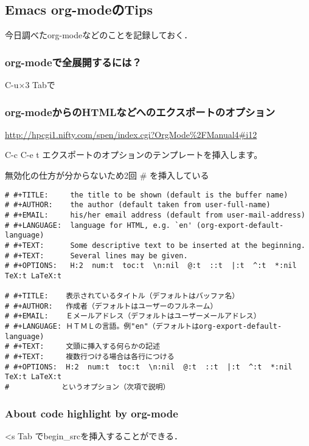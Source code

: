 \documentclass[11pt]{article}
\begin{document}
\subsection{Emacs org-modeのTips}
\label{sec-2-2}

今日調べたorg-modeなどのことを記録しておく．
\subsubsection{org-modeで全展開するには？}
\label{sec-2-2-1}

C-u×3 Tabで
\subsubsection{org-modeからのHTMLなどへのエクスポートのオプション}
\label{sec-2-2-2}

\href{http://hpcgi1.nifty.com/spen/index.cgi?OrgMode%2FManual4#i12}{http://hpcgi1.nifty.com/spen/index.cgi?OrgMode\%2FManual4\#i12}

C-c C-e t       エクスポートのオプションのテンプレートを挿入します。

無効化の仕方が分からないため2回 \# を挿入している

\begin{verbatim}
# #+TITLE:     the title to be shown (default is the buffer name)
# #+AUTHOR:    the author (default taken from user-full-name)
# #+EMAIL:     his/her email address (default from user-mail-address)
# #+LANGUAGE:  language for HTML, e.g. `en' (org-export-default-language)
# #+TEXT:      Some descriptive text to be inserted at the beginning.
# #+TEXT:      Several lines may be given.
# #+OPTIONS:   H:2  num:t  toc:t  \n:nil  @:t  ::t  |:t  ^:t  *:nil  TeX:t LaTeX:t

# #+TITLE:    表示されているタイトル（デフォルトはバッファ名）
# #+AUTHOR:   作成者（デフォルトはユーザーのフルネーム）
# #+EMAIL:    Ｅメールアドレス（デフォルトはユーザーメールアドレス）
# #+LANGUAGE: ＨＴＭＬの言語。例"en"（デフォルトはorg-export-default-language)
# #+TEXT:     文頭に挿入する何らかの記述
# #+TEXT:     複数行つける場合は各行につける
# #+OPTIONS:  H:2  num:t  toc:t  \n:nil  @:t  ::t  |:t  ^:t  *:nil  TeX:t LaTeX:t
#            というオプション（次項で説明）
\end{verbatim}
\subsubsection{About code highlight by org-mode}
\label{sec-2-2-3}

<s Tab でbegin\_srcを挿入することができる．
\end{document}
